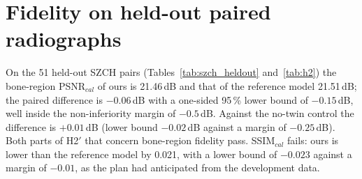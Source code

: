 

\section{Fidelity on held-out paired radiographs}
On the 51 held-out SZCH pairs (Tables~\ref{tab:szch_heldout} and~\ref{tab:h2}) the bone-region PSNR$_{cal}$ of ours is 21.46\,dB and that of
the reference model 21.51\,dB; the paired difference is $-0.06$\,dB with a one-sided 95\,\% lower bound of $-0.15$\,dB, well inside the
non-inferiority margin of $-0.5$\,dB. Against the no-twin control the difference is $+0.01$\,dB (lower bound $-0.02$\,dB against a margin of
$-0.25$\,dB). Both parts of H2$'$ that concern bone-region fidelity pass. SSIM$_{cal}$ fails: ours is lower than the reference model by 0.021,
with a lower bound of $-0.023$ against a margin of $-0.01$, as the plan had anticipated from the development data.

